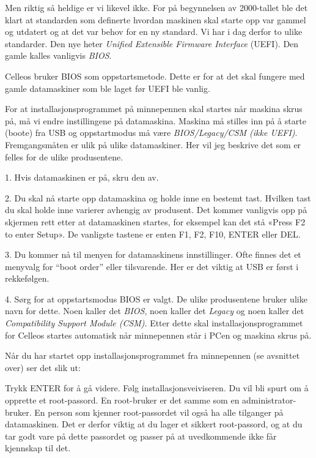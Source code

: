 Men riktig s\aa{} heldige er vi likevel ikke. For p\aa{} begynnelsen av 2000-tallet ble det klart at standarden som definerte hvordan maskinen skal starte opp var gammel og utdatert og at det var behov for en ny standard. Vi har i dag derfor to ulike standarder. Den nye heter {\it Unified Extensible Firmware Interface} (UEFI). Den gamle kalles vanligvis {\it BIOS}. 

Celleos bruker BIOS som oppstartsmetode. Dette er for at det skal fungere med gamle datamaskiner som ble laget f\o r UEFI ble vanlig. 


For at installasjonsprogrammet p\aa{} minnepennen skal startes n\aa r maskina skrus p\aa , m\aa{} vi endre instillingene p\aa{} datamaskina. Maskina m\aa{} stilles inn p\aa{} \aa{} starte (boote) fra USB og oppstartmodus m\aa{} v\ae re {\it BIOS/Legacy/CSM (ikke UEFI)}. Fremgangsm\aa ten er ulik p\aa{} ulike datamaskiner. Her vil jeg beskrive det som er felles for de ulike produsentene. 
\item{1.} Hvis datamaskinen er p\aa, skru den av.
\item{2.} Du skal n\aa{} starte opp datamaskina og holde inne en bestemt tast. Hvilken tast du skal holde inne varierer avhengig av produsent. Det kommer vanligvis opp p\aa{} skjermen rett etter at datamaskinen startes, for eksempel kan det st\aa{} «Press F2 to enter Setup». De vanligste tastene er enten F1, F2, F10, ENTER eller DEL.
\item{3.} Du kommer n\aa{} til menyen for datamaskinens innstillinger. Ofte finnes det et menyvalg for ``boot order'' eller tilsvarende. Her er det viktig at USB er f\o rst i rekkef\o lgen.
\item{4.} S\o rg for at oppstartsmodus BIOS er valgt. De ulike produsentene bruker ulike navn for dette. Noen kaller det {\it BIOS}, noen kaller det {\it Legacy} og noen kaller det {\it Compatibility Support Module (CSM)}. 
Etter dette skal installasjonsprogrammet for Celleos startes automatisk n\aa r minnepennen st\aa r i PCen og maskina skrus p\aa.



N\aa r du har startet opp installasjonsprogrammet fra minnepennen (se avsnittet over) ser det slik ut:

\centerline{
\epsfxsize 9cm
}

Trykk ENTER for \aa{} g\aa{} videre.
F\o lg installasjonsveiviseren. Du vil bli spurt om \aa{} opprette et root-passord. En root-bruker er det samme som en administrator-bruker. En person som kjenner root-passordet vil ogs\aa{} ha alle tilganger p\aa{} datamaskinen. Det er derfor viktig at du lager et sikkert root-passord, og at du tar godt vare p\aa{} dette passordet og passer p\aa{} at uvedkommende ikke f\aa r kjennskap til det. 

